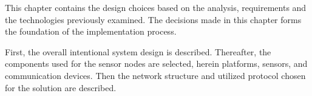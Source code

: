 \label{cha:designintro}

This chapter contains the design choices based on the analysis, requirements and the technologies previously examined. The decisions made in this chapter forms the foundation of the implementation process.

First, the overall intentional system design is described. Thereafter, the components used for the sensor nodes are selected, herein platforms, sensors, and communication devices.
Then the network structure and utilized protocol chosen for the solution are described.

